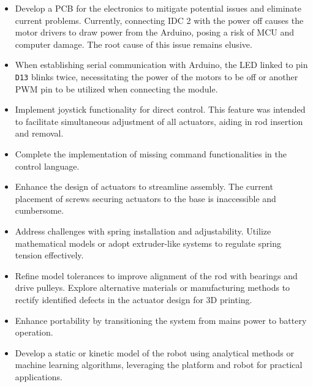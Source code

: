 \begin{itemize}
    \item Develop a PCB for the electronics to mitigate potential issues and eliminate current problems. Currently, connecting IDC 2 with the power off causes the motor drivers to draw power from the Arduino, posing a risk of MCU and computer damage. The root cause of this issue remains elusive.
    
    \item When establishing serial communication with Arduino, the LED linked to pin \texttt{D13} blinks twice, necessitating the power of the motors to be off or another PWM pin to be utilized when connecting the module.
    
    \item Implement joystick functionality for direct control. This feature was intended to facilitate simultaneous adjustment of all actuators, aiding in rod insertion and removal.
    
    \item Complete the implementation of missing command functionalities in the control language.
    
    \item Enhance the design of actuators to streamline assembly. The current placement of screws securing actuators to the base is inaccessible and cumbersome.
    
    \item Address challenges with spring installation and adjustability. Utilize mathematical models or adopt extruder-like systems to regulate spring tension effectively.
    
    \item Refine model tolerances to improve alignment of the rod with bearings and drive pulleys. Explore alternative materials or manufacturing methods to rectify identified defects in the actuator design for 3D printing.
    
    \item Enhance portability by transitioning the system from mains power to battery operation.
    
    \item Develop a static or kinetic model of the robot using analytical methods or machine learning algorithms, leveraging the platform and robot for practical applications.
\end{itemize}